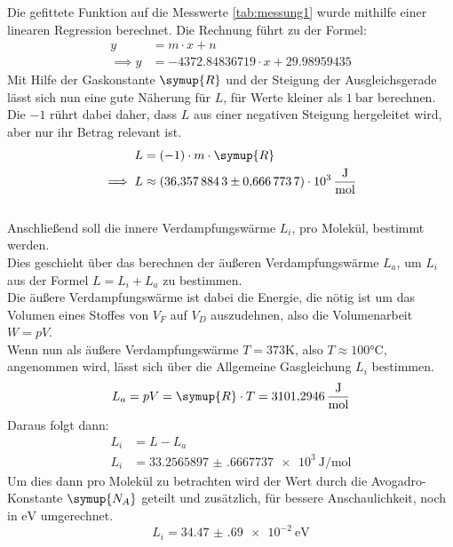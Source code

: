 Die gefittete Funktion auf die Messwerte \ref{tab:messung1} wurde mithilfe einer linearen Regression berechnet.
Die Rechnung führt zu der Formel:
\begin{align}
    y&=m\cdot x+n \nonumber\\
    \implies y&=-4372.84836719 \cdot x+29.98959435 \label{eqn:fit1}
\end{align}
Mit Hilfe der Gaskonstante $\symup{R}$ \cite{Chemie.de-Gaskonstante}
und der Steigung der Ausgleichsgerade lässt sich nun eine gute Näherung für $L$, für Werte kleiner als $\SI{1}{\bar}$ berechnen.
Die $-1$ rührt dabei daher, dass $L$ aus einer negativen Steigung hergeleitet wird, aber nur ihr Betrag relevant ist.
\begin{align}
    L&=(-1) \cdot m \cdot \symup{R} \nonumber\\
    \implies L&\approx\SI{36.3578843(6667737)e3}{\joule\per\mol} \nonumber
\end{align}\\
Anschließend soll die innere Verdampfungswärme $L_i$, pro Molekül, bestimmt werden.\\
Dies geschieht über das berechnen der äußeren Verdampfungswärme $L_a$, um $L_i$ aus der Formel $L=L_i+L_a$ zu bestimmen.\\
Die äußere Verdampfungswärme ist dabei die Energie, die nötig ist um das Volumen eines Stoffes von $V_F$ auf $V_D$ auszudehnen,
also die Volumenarbeit $W=pV$.\\
Wenn nun als äußere Verdampfungswärme $T=373 \si{\kelvin}$, also $T\approx 100 \si{\celsius}$, angenommen wird, lässt sich über die Allgemeine Gasgleichung $L_i$ bestimmen.
\begin{equation}
    L_a=pV=\symup{R} \cdot T = \SI{3101.2946}{\joule\per\mol} \nonumber
\end{equation}
Daraus folgt dann:
\begin{align}
    L_i&=L-L_a \nonumber\\
    L_i&=\SI{33.2565897(6667737)e3}{\joule\per\mol} \nonumber
\end{align}
Um dies dann pro Molekül zu betrachten wird der Wert durch die Avogadro-Konstante $\symup{N_A}$ \cite{Chemie.de-Avogadro-Konstante}
geteilt und zusätzlich, für bessere Anschaulichkeit,
noch in $\si{\electronvolt}$ umgerechnet.
\begin{equation}
    L_i=\SI{34.47(69)e-2}{\electronvolt} \nonumber
\end{equation}

\clearpage



